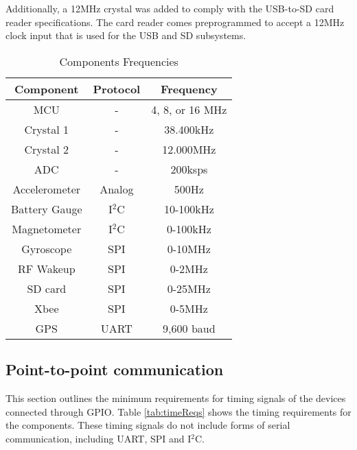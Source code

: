 Additionally, a 12MHz crystal was added to comply with the USB-to-SD card reader specifications. The card reader comes preprogrammed to accept a 12MHz clock input that is used for the USB and SD subsystems.

\begin{table}[H]
  \centering
  \caption{Components Frequencies}
    \begin{tabular}{|c|c|c|}
    \hline
    \rowcolor{Gray}
    Component & Protocol & Frequency \\
    \hline \hline
    MCU   & -     & 4, 8, or 16 MHz \\ \hline
    Crystal 1 & -     & 38.400kHz \\ \hline
    Crystal 2 & -     & 12.000MHz \\ \hline
    ADC   & -     & 200ksps \\ \hline
    Accelerometer & Analog & 500Hz \\ \hline
    Battery Gauge & I$^2$C & 10-100kHz \\ \hline
    Magnetometer & I$^2$C & 0-100kHz \\ \hline
    Gyroscope & SPI   & 0-10MHz \\ \hline
    RF Wakeup & SPI   & 0-2MHz \\ \hline
    SD card & SPI   & 0-25MHz \\ \hline
    Xbee  & SPI   & 0-5MHz \\ \hline
    GPS   & UART  & 9,600 baud \\ \hline
    \end{tabular}%
  \label{tab:compFreq}%
\end{table}%

\subsection{Point-to-point communication}
This section outlines the minimum requirements for timing signals of the devices connected through GPIO. Table \ref{tab:timeReqs} shows the timing requirements for the components. These timing signals do not include forms of serial communication, including UART, SPI and I$^2$C.

